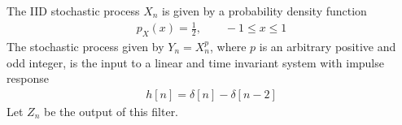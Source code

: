 \ifspanish

\else

The IID stochastic process $X_n$ is given by a probability density function
\begin{align*}
p_X(x) = \frac12, \qquad   -1\le x \le 1
\end{align*}
The stochastic process given by $Y_n = X_n^p$, where $p$ is an arbitrary positive and odd integer, is the input to a linear and time invariant system with impulse response
\begin{align*}
h[n] = \delta[n] - \delta[n-2]
\end{align*}
Let $Z_n$ be the output of this filter.


